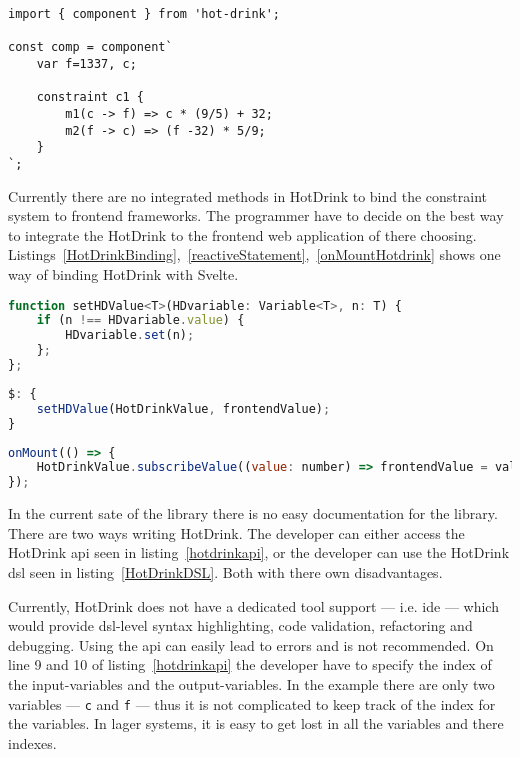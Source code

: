 \begin{lstlisting}[caption={Example of the HotDrink \gls{dsl}},label=HotDrinkDSL, language=hotdrink]
import { component } from 'hot-drink';

const comp = component`
    var f=1337, c;

    constraint c1 {
        m1(c -> f) => c * (9/5) + 32;
        m2(f -> c) => (f -32) * 5/9;
    }
`;
\end{lstlisting}

Currently there are no integrated methods in HotDrink to bind the constraint system to 
frontend frameworks. The programmer have to decide on the best way to integrate the 
HotDrink to the frontend web application of there choosing. 
Listings~\ref{HotDrinkBinding},~\ref{reactiveStatement},~\ref{onMountHotdrink} shows one 
way of binding HotDrink with Svelte.

\begin{lstlisting}[caption={Function for binding HotDrink and Svelte variable},label=HotDrinkBinding, language=javascript]
function setHDValue<T>(HDvariable: Variable<T>, n: T) {
    if (n !== HDvariable.value) { 
        HDvariable.set(n);
    };
};
\end{lstlisting}

\begin{lstlisting}[caption={Using the reactive statement, in Svelte~\cite{sveltedocs}, to update HotDrink corresopnding value, and trigger HotDrink to enforce the constraint system},label=reactiveStatement, language=javascript]
$: {
    setHDValue(HotDrinkValue, frontendValue);
}
\end{lstlisting}

\begin{lstlisting}[caption={Using the onMount callback, in Svelte~\cite{sveltedocs}, to update the frontend value that correspont to the same value in HotDrink, when the HotDrink value changes.},label=onMountHotdrink, language=javascript]
onMount(() => {
    HotDrinkValue.subscribeValue((value: number) => frontendValue = value);
});
\end{lstlisting}

In the current sate of the library there is no easy documentation for the library. There are two ways writing HotDrink. The developer can either access the HotDrink \gls{api} seen in listing~\ref{hotdrinkapi}, or the developer can use the HotDrink \gls{dsl} seen in listing~\ref{HotDrinkDSL}. Both with there own disadvantages. 

Currently, HotDrink does not have a dedicated tool support --- i.e. \gls{ide} --- which 
would provide \gls{dsl}-level syntax highlighting, code validation, refactoring and 
debugging. Using the \gls{api} can easily lead to errors and is not recommended. On line 9 and 10 of listing~\ref{hotdrinkapi} the developer have to specify the index of the 
input-variables and the output-variables. In the example there are only two variables 
--- \texttt{c} and \texttt{f} --- thus it is not complicated to keep track of the index 
for the variables. In lager systems, it is easy to get lost in all the variables and 
there indexes.

